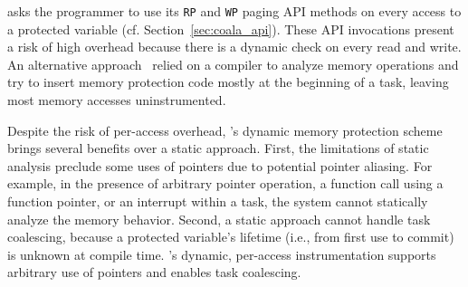 \sys asks the programmer to use its {\tt RP} and {\tt WP} paging API methods on
every access to a protected variable (cf. Section~\ref{sec:coala_api}).  These
API invocations present a risk of high overhead because there is a dynamic
check on every read and write. An alternative approach~\cite{alpaca} relied on a compiler to analyze memory operations and try to insert memory protection code mostly at the beginning of a task, leaving most
memory accesses uninstrumented.

Despite the risk of per-access overhead, \sys's dynamic memory protection
scheme brings several benefits over a static approach.  First, the limitations
of static analysis preclude some uses of pointers due to potential pointer
aliasing. For example, in the presence of arbitrary pointer operation, a
function call using a function pointer, or an interrupt within a task, the
system cannot statically analyze the memory behavior.   Second, a static approach
cannot handle task coalescing, because a protected variable's lifetime (i.e.,
from first use to commit) is unknown at compile time. \sys's dynamic,
per-access instrumentation supports arbitrary use of pointers and enables task
coalescing.
%


